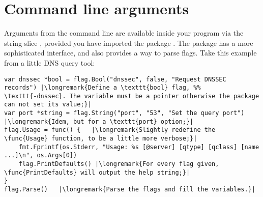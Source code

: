 \section{Command line arguments}
\label{sec:option parsing}
Arguments from the command line are available inside your program via
the string slice , provided you have imported the package
. The  package has a more sophisticated
interface, and also provides a way to parse flags. Take this example
from a little DNS query tool:
\begin{lstlisting}
var dnssec *bool = flag.Bool("dnssec", false, "Request DNSSEC records") |\longremark{Define a \texttt{bool} flag, %%
\texttt{-dnssec}. The variable must be a pointer otherwise the package can not set its value;}|
var port *string = flag.String("port", "53", "Set the query port")      |\longremark{Idem, but for a \texttt{port} option;}|
flag.Usage = func() {   |\longremark{Slightly redefine the \func{Usage} function, to be a little more verbose;}|
    fmt.Fprintf(os.Stderr, "Usage: %s [@server] [qtype] [qclass] [name ...]\n", os.Args[0])
    flag.PrintDefaults() |\longremark{For every flag given, \func{PrintDefaults} will output the help string;}|
}
flag.Parse()   |\longremark{Parse the flags and fill the variables.}|
\end{lstlisting}
\showremarks

